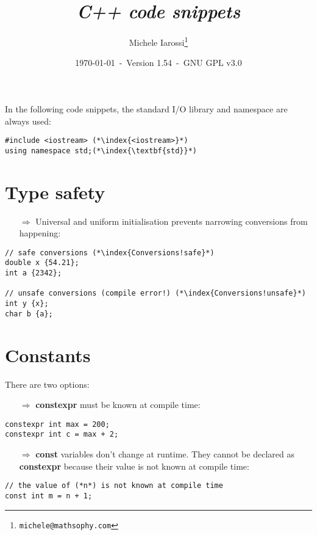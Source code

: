 \documentclass[10pt]{article}
\begin{document}
\title{\emph{C++ code snippets}}
\author{Michele Iarossi\thanks{\texttt{michele@mathsophy.com}}}
\date{\small \today~-~Version 1.54~-~GNU GPL v3.0}


\maketitle

\small

\begin{frame}{}
\setlength\columnsep{1cm}
\begin{multicols}{2}
\tableofcontents
\end{multicols}
\end{frame}

\noindent
In the following code snippets, the standard I/O library and namespace are always used:
\begin{lstlisting}
#include <iostream> (*\index{<iostream>}*)
using namespace std;(*\index{\textbf{std}}*) 
\end{lstlisting}

\newpage
%
%
\section{Type safety}
\small
\begin{enumerate}
\item[$\Rightarrow$] Universal and uniform initialisation prevents narrowing conversions from happening:
\end{enumerate}
\begin{lstlisting}
// safe conversions (*\index{Conversions!safe}*)
double x {54.21};
int a {2342};

// unsafe conversions (compile error!) (*\index{Conversions!unsafe}*)
int y {x};
char b {a};
\end{lstlisting}
%
%
\section{Constants}
\small
There are two options:
\begin{enumerate}
\item[$\Rightarrow$] \textbf{constexpr} must be known at compile time:
\end{enumerate}
\begin{lstlisting}
constexpr int max = 200;
constexpr int c = max + 2;
\end{lstlisting}
\begin{enumerate}
\item[$\Rightarrow$] \textbf{const} variables don't change at runtime. They cannot be declared as
\textbf{constexpr} because their value is not known at compile time:
\end{enumerate}
\begin{lstlisting}
// the value of (*n*) is not known at compile time
const int m = n + 1;
\end{lstlisting}
%
%
\end{document}
